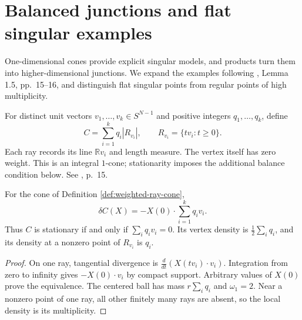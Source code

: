 \chapter{Balanced junctions and flat singular examples}\label{sec:cone-junctions}
One-dimensional cones provide explicit singular models, and products turn them into higher-dimensional junctions. We expand the examples following \cite{Minter}, Lemma 1.5, pp.~15--16, and distinguish flat singular points from regular points of high multiplicity.

\begin{definition}\label{def:weighted-ray-cone}
For distinct unit vectors $v_1,\ldots,v_k\in S^{N-1}$ and positive integers $q_1,\ldots,q_k$, define
\[
 C=\sum_{i=1}^k q_i|R_{v_i}|,\qquad
 R_{v_i}=\{t v_i:t\geq0\}.
\]
Each ray records its line $\mathbb R v_i$ and length measure. The vertex itself has zero weight. This is an integral $1$-cone; stationarity imposes the additional balance condition below. See \cite{Minter}, p.~15.
\end{definition}

\begin{proposition}\label{prop:ray-junction-balance}
For the cone of Definition \ref{def:weighted-ray-cone},
\[
 \delta C(X)=-X(0)\cdot\sum_{i=1}^kq_iv_i.
\]
Thus $C$ is stationary if and only if $\sum_iq_iv_i=0$. Its vertex density is $\frac12\sum_iq_i$, and its density at a nonzero point of $R_{v_i}$ is $q_i$.
\end{proposition}
\begin{proof}
On one ray, tangential divergence is $\frac d{dt}(X(tv_i)\cdot v_i)$. Integration from zero to infinity gives $-X(0)\cdot v_i$ by compact support. Arbitrary values of $X(0)$ prove the equivalence. The centered ball has mass $r\sum_iq_i$ and $\omega_1=2$. Near a nonzero point of one ray, all other finitely many rays are absent, so the local density is its multiplicity.
\end{proof}

